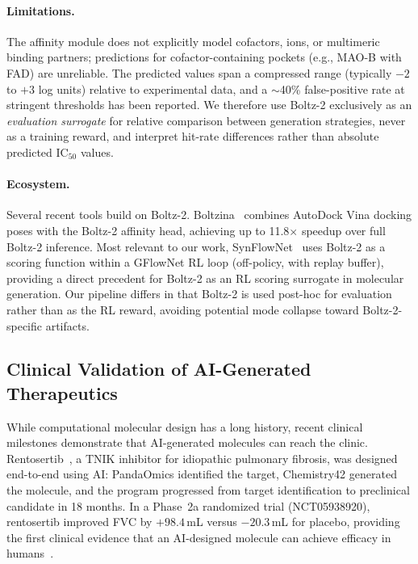 \paragraph{Limitations.}
The affinity module does not explicitly model cofactors, ions, or
multimeric binding partners; predictions for cofactor-containing pockets
(e.g., MAO-B with FAD) are unreliable.
The predicted values span a compressed range (typically
$-2$ to $+3$ log units) relative to experimental data, and a
$\sim$40\% false-positive rate at stringent thresholds has been
reported.
We therefore use Boltz-2 exclusively as an \emph{evaluation surrogate}
for relative comparison between generation strategies, never as a
training reward, and interpret hit-rate differences rather than
absolute predicted IC$_{50}$ values.

\paragraph{Ecosystem.}
Several recent tools build on Boltz-2.
Boltzina~\citep{furui2025boltzina} combines AutoDock Vina docking poses
with the Boltz-2 affinity head, achieving up to 11.8$\times$ speedup
over full Boltz-2 inference.
Most relevant to our work, SynFlowNet~\citep{cretu2025synflownet}
uses Boltz-2 as a scoring function within a GFlowNet RL loop
(off-policy, with replay buffer), providing a direct precedent for
Boltz-2 as an RL scoring surrogate in molecular generation.
Our pipeline differs in that Boltz-2 is used post-hoc for evaluation
rather than as the RL reward, avoiding potential mode collapse
toward Boltz-2-specific artifacts.

\subsection{Clinical Validation of AI-Generated Therapeutics}
\label{sec:rw:clinical}

While computational molecular design has a long history, recent clinical
milestones demonstrate that AI-generated molecules can reach the clinic.
Rentosertib~\citep{xu2025rentosertib}, a TNIK inhibitor for idiopathic
pulmonary fibrosis, was designed end-to-end using AI: PandaOmics
identified the target, Chemistry42 generated the molecule, and the
program progressed from target identification to preclinical candidate
in 18 months.
In a Phase~2a randomized trial (NCT05938920), rentosertib improved FVC
by $+98.4$\,mL versus $-20.3$\,mL for placebo, providing the first
clinical evidence that an AI-designed molecule can achieve efficacy
in humans~\citep{xu2025rentosertib}.

